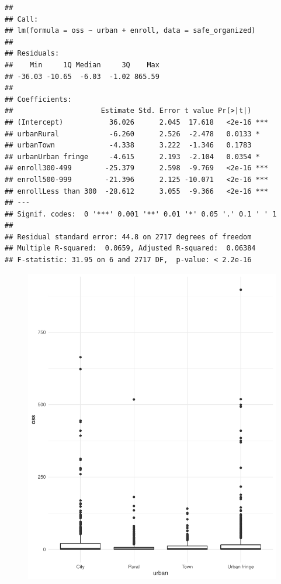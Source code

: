 \documentclass[man]{apa6}
\begin{document}
\begin{verbatim}
## 
## Call:
## lm(formula = oss ~ urban + enroll, data = safe_organized)
## 
## Residuals:
##    Min     1Q Median     3Q    Max 
## -36.03 -10.65  -6.03  -1.02 865.59 
## 
## Coefficients:
##                     Estimate Std. Error t value Pr(>|t|)    
## (Intercept)           36.026      2.045  17.618   <2e-16 ***
## urbanRural            -6.260      2.526  -2.478   0.0133 *  
## urbanTown             -4.338      3.222  -1.346   0.1783    
## urbanUrban fringe     -4.615      2.193  -2.104   0.0354 *  
## enroll300-499        -25.379      2.598  -9.769   <2e-16 ***
## enroll500-999        -21.396      2.125 -10.071   <2e-16 ***
## enrollLess than 300  -28.612      3.055  -9.366   <2e-16 ***
## ---
## Signif. codes:  0 '***' 0.001 '**' 0.01 '*' 0.05 '.' 0.1 ' ' 1
## 
## Residual standard error: 44.8 on 2717 degrees of freedom
## Multiple R-squared:  0.0659, Adjusted R-squared:  0.06384 
## F-statistic: 31.95 on 6 and 2717 DF,  p-value: < 2.2e-16
\end{verbatim}

\begin{figure}
\centering
\includegraphics{Final-Project_Zhang_Wright_files/figure-latex/model-1.pdf}
\caption{}
\end{figure}
\end{document}
